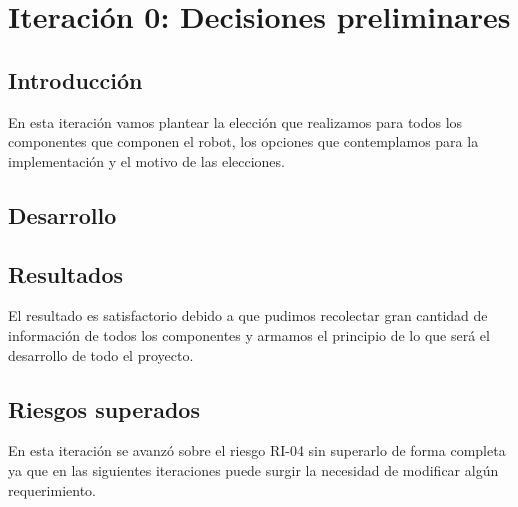 \newpage
\section{Iteración 0: Decisiones preliminares}
\subsection{Introducción}
En esta iteración vamos plantear la elección que realizamos para todos los componentes que componen el robot, los opciones que contemplamos para la implementación y el motivo de las elecciones.



\subsection{Desarrollo}

















\subsection{Resultados}
El resultado es satisfactorio debido a que pudimos recolectar gran cantidad de información de todos los componentes y armamos el principio de lo que será el desarrollo de todo el proyecto.

\newpage
\subsection{Riesgos superados}

En esta iteración se avanzó sobre el riesgo RI-04 sin superarlo de forma completa ya que en las siguientes iteraciones puede surgir la necesidad de modificar algún requerimiento.

